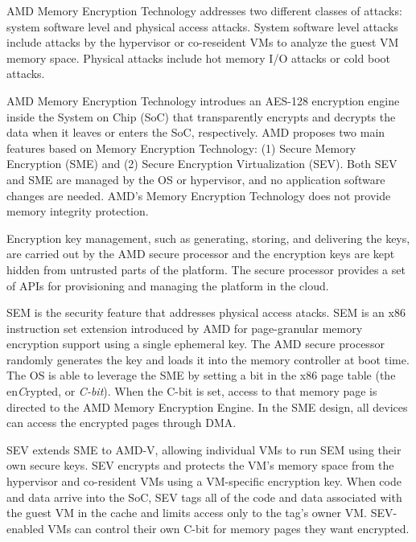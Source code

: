 %
AMD Memory Encryption Technology addresses two different classes of attacks:
system software level and physical access attacks.  
%
System software level attacks include attacks by the hypervisor or co-reseident
VMs to analyze the guest VM memory space.
%
Physical attacks include hot memory I/O attacks or cold boot attacks.


AMD Memory Encryption Technology introdues an AES-128 encryption engine inside
the System on Chip (SoC) that transparently encrypts and decrypts the data
when it leaves or enters the SoC, respectively.
%
AMD proposes two main features based on Memory Encryption Technology: (1)
Secure Memory Encryption (SME) and (2) Secure Encryption Virtualization (SEV)\@.
%
Both SEV and SME are managed by the OS or hypervisor, and no application software
changes are needed.
%
AMD's Memory Encryption Technology does not provide memory integrity
protection.


Encryption key management, such as generating, storing, and delivering the
keys, are carried out by the AMD secure processor and the encryption keys are kept
hidden from untrusted parts of the platform.
%
%
The secure processor provides a set of APIs for provisioning and managing
the platform in the cloud.


SEM is the security feature that addresses physical access atacks.
%
SEM is an x86 instruction set extension introduced by AMD for page-granular
memory encryption support using a single ephemeral key.
%
The AMD secure processor randomly generates the key and loads it into the
memory controller at boot time.
%
The OS is able to leverage the SME by setting a bit in the x86 page table (the
en\emph{C}rypted, or \emph{C-bit}).
%
When the C-bit is set, access to that memory page is directed to the AMD Memory
Encryption Engine.
%
In the SME design, all devices can access the encrypted pages through DMA\@.




SEV extends SME to AMD-V, allowing individual VMs to run SEM using their own
secure keys.
%
SEV encrypts and protects the VM's memory space from the hypervisor and
co-resident VMs using a VM-specific encryption key.
%
When code and data arrive into the SoC, SEV tags all of the code and data
associated with the guest VM in the cache and limits access only to the tag's
owner VM.
%
%
SEV-enabled VMs can control their own C-bit for memory pages they want
encrypted.


